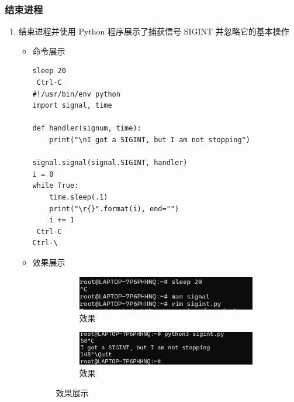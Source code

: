 \documentclass[UTF8]{ctexart}
\begin{document}
\subsubsection{结束进程}

\begin{enumerate}
  \item 结束进程并使用 Python 程序展示了捕获信号 SIGINT 并忽略它的基本操作
  \begin{itemize}
  \item 命令展示
  \begin{verbatim}
sleep 20
 Ctrl-C
#!/usr/bin/env python
import signal, time

def handler(signum, time):
    print("\nI got a SIGINT, but I am not stopping")

signal.signal(signal.SIGINT, handler)
i = 0
while True:
    time.sleep(.1)
    print("\r{}".format(i), end="")
    i += 1
 Ctrl-C
Ctrl-\
  \end{verbatim}
\item 效果展示
  \begin{figure}[H]
    \centering
    \begin{subfigure}[b]{0.48\textwidth}
        \includegraphics[width=\textwidth]{11} %
        \caption{效果}
        \label{fig:left}
    \end{subfigure}
    \hfill
    \begin{subfigure}[b]{0.48\textwidth}
        \includegraphics[width=\textwidth]{1111} %
        \caption{效果}
        \label{fig:right}
    \end{subfigure}
    \caption{效果展示}
    \label{fig:side_by_side}
\end{figure}
  \end{itemize}
\end{enumerate}


\end{document}
